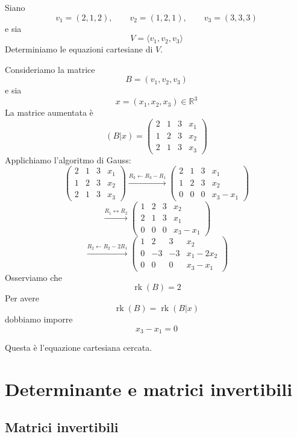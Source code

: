 \documentclass[
  a4paper,
]{article}
\begin{document}
\begin{examplebox}
Siano \[
v_1=(2,1,2),
\qquad
v_2=(1,2,1),
\qquad
v_3=(3,3,3)
\] e sia \[
V=\langle v_1,v_2,v_3\rangle
\] Determiniamo le equazioni cartesiane di \(V\).

Consideriamo la matrice \[
B=(v_1,v_2,v_3)
\] e sia \[
x=(x_1,x_2,x_3)\in\mathbb{R}^3
\] La matrice aumentata è \[
(B|x)=
\begin{pmatrix}
2 & 1 & 3 & x_1\\
1 & 2 & 3 & x_2\\
2 & 1 & 3 & x_3
\end{pmatrix}
\] Applichiamo l'algoritmo di Gauss: \[
\begin{pmatrix}
2 & 1 & 3 & x_1\\
1 & 2 & 3 & x_2\\
2 & 1 & 3 & x_3
\end{pmatrix}
\overset{R_3\leftarrow R_3-R_1}{\longrightarrow}
\begin{pmatrix}
2 & 1 & 3 & x_1\\
1 & 2 & 3 & x_2\\
0 & 0 & 0 & x_3-x_1
\end{pmatrix}
\] \[
\overset{R_1 \leftrightarrow R_2}{\longrightarrow}
\begin{pmatrix}
1 & 2 & 3 & x_2\\
2 & 1 & 3 & x_1\\
0 & 0 & 0 & x_3-x_1
\end{pmatrix}
\] \[
\overset{R_2\leftarrow R_2-2R_1}{\longrightarrow}
\begin{pmatrix}
1 & 2 & 3 & x_2\\
0 & -3 & -3 & x_1-2x_2\\
0 & 0 & 0 & x_3-x_1
\end{pmatrix}
\] Osserviamo che \[
\operatorname{rk}(B)=2
\] Per avere \[
\operatorname{rk}(B)=\operatorname{rk}(B|x)
\] dobbiamo imporre \[
x_3-x_1=0
\]

Questa è l'equazione cartesiana cercata.
\end{examplebox}

\newpage

\hypertarget{determinante-e-matrici-invertibili}{%
\section{Determinante e matrici
invertibili}\label{determinante-e-matrici-invertibili}}

\hypertarget{matrici-invertibili}{%
\subsection{Matrici invertibili}\label{matrici-invertibili}}
\end{document}
